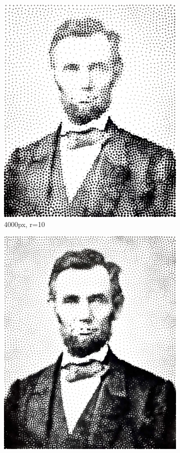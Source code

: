 \documentclass[11pt]{article}
\begin{document}
\begin{figure}[H]
\begin{subfigure}[b]{0.2\linewidth}
		\includegraphics[width=\linewidth]{pix/hc_AL_4000_r10.png}
		\caption{4000px, r=10}
	\end{subfigure}
	\begin{subfigure}[b]{0.2\linewidth}
		\includegraphics[width=\linewidth]{pix/hc_AL_8000_r10.png}

\end{subfigure}
\end{figure}
\end{document}
